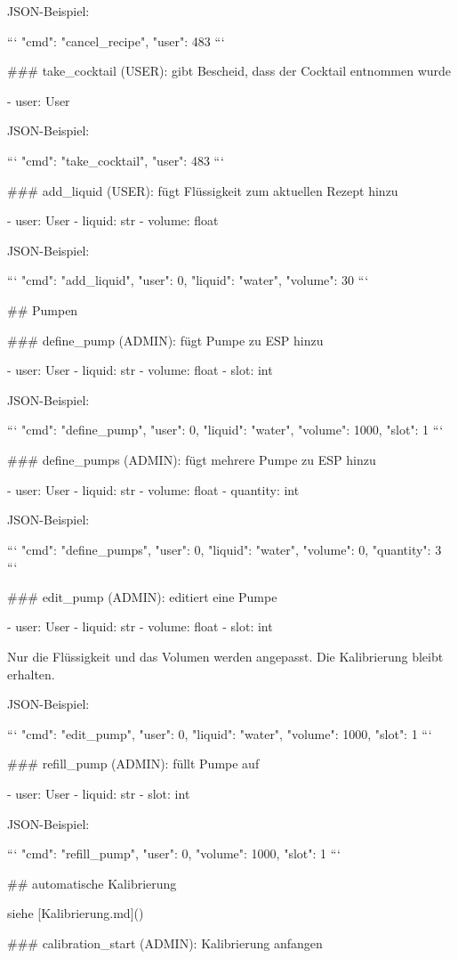 JSON-Beispiel:

```
{"cmd": "cancel_recipe", "user": 483}
```

### take_cocktail (USER): gibt Bescheid, dass der Cocktail entnommen wurde

- user: User

JSON-Beispiel:

```
{"cmd": "take_cocktail", "user": 483}
```

### add_liquid (USER): fügt Flüssigkeit zum aktuellen Rezept hinzu

- user: User
- liquid: str
- volume: float

JSON-Beispiel:

```
{"cmd": "add_liquid", "user": 0, "liquid": "water", "volume": 30}
```

## Pumpen

### define_pump (ADMIN): fügt Pumpe zu ESP hinzu

- user: User
- liquid: str
- volume: float
- slot: int

JSON-Beispiel:

```
{"cmd": "define_pump", "user": 0, "liquid": "water", "volume": 1000, "slot": 1}
```

### define_pumps (ADMIN): fügt mehrere Pumpe zu ESP hinzu

- user: User
- liquid: str
- volume: float
- quantity: int

JSON-Beispiel:

```
{"cmd": "define_pumps", "user": 0, "liquid": "water", "volume": 0, "quantity": 3}
```

### edit_pump (ADMIN): editiert eine Pumpe

- user: User
- liquid: str
- volume: float
- slot: int

Nur die Flüssigkeit und das Volumen werden angepasst. Die Kalibrierung bleibt erhalten.

JSON-Beispiel:

```
{"cmd": "edit_pump", "user": 0, "liquid": "water", "volume": 1000, "slot": 1}
```

### refill_pump (ADMIN): füllt Pumpe auf

- user: User
- liquid: str
- slot: int

JSON-Beispiel:

```
{"cmd": "refill_pump", "user": 0, "volume": 1000, "slot": 1}
```

## automatische Kalibrierung

siehe [Kalibrierung.md]()

### calibration_start (ADMIN): Kalibrierung anfangen

